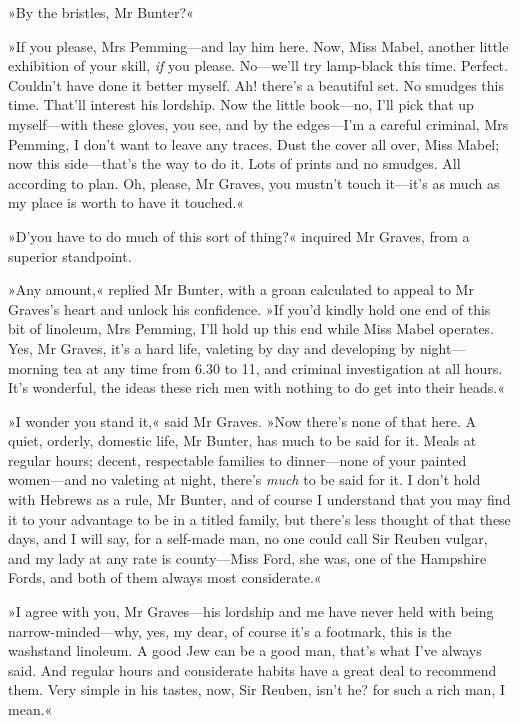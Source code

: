 »By the bristles, Mr Bunter?«

»If you please, Mrs Pemming—and lay him here. Now, Miss Mabel, another little exhibition of your skill, \textit{if} you please. No—we'll try lamp-black this time. Perfect. Couldn't have done it better myself. Ah! there's a beautiful set. No smudges this time. That'll interest his lordship. Now the little book—no, I'll pick that up myself—with these gloves, you see, and by the edges—I'm a careful criminal, Mrs Pemming, I don't want to leave any traces. Dust the cover all over, Miss Mabel; now this side—that's the way to do it. Lots of prints and no smudges. All according to plan. Oh, please, Mr Graves, you mustn't touch it—it's as much as my place is worth to have it touched.«

»D'you have to do much of this sort of thing?« inquired Mr Graves, from a superior standpoint.

»Any amount,« replied Mr Bunter, with a groan calculated to appeal to Mr Graves's heart and unlock his confidence. »If you'd kindly hold one end of this bit of linoleum, Mrs Pemming, I'll hold up this end while Miss Mabel operates. Yes, Mr Graves, it's a hard life, valeting by day and developing by night—morning tea at any time from 6.30 to 11, and criminal investigation at all hours. It's wonderful, the ideas these rich men with nothing to do get into their heads.«

»I wonder you stand it,« said Mr Graves. »Now there's none of that here. A quiet, orderly, domestic life, Mr Bunter, has much to be said for it. Meals at regular hours; decent, respectable families to dinner—none of your painted women—and no valeting at night, there's \textit{much} to be said for it. I don't hold with Hebrews as a rule, Mr Bunter, and of course I understand that you may find it to your advantage to be in a titled family, but there's less thought of that these days, and I will say, for a self-made man, no one could call Sir Reuben vulgar, and my lady at any rate is county—Miss Ford, she was, one of the Hampshire Fords, and both of them always most considerate.«

»I agree with you, Mr Graves—his lordship and me have never held with being narrow-minded—why, yes, my dear, of course it's a footmark, this is the washstand linoleum. A good Jew can be a good man, that's what I've always said. And regular hours and considerate habits have a great deal to recommend them. Very simple in his tastes, now, Sir Reuben, isn't he? for such a rich man, I mean.«

